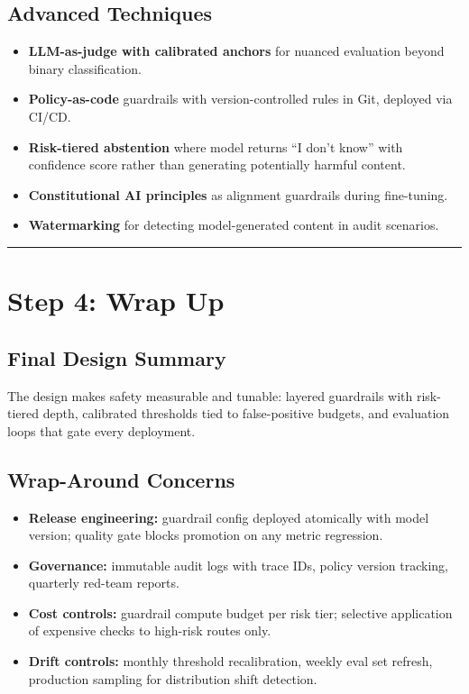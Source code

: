 \subsection*{Advanced Techniques}

\begin{itemize}
  \item \textbf{LLM-as-judge with calibrated anchors} for nuanced evaluation beyond binary classification.
  \item \textbf{Policy-as-code} guardrails with version-controlled rules in Git, deployed via CI/CD.
  \item \textbf{Risk-tiered abstention} where model returns ``I don't know'' with confidence score rather than generating potentially harmful content.
  \item \textbf{Constitutional AI principles} as alignment guardrails during fine-tuning.
  \item \textbf{Watermarking} for detecting model-generated content in audit scenarios.
\end{itemize}

\bigskip\hrule\bigskip

\section*{Step 4: Wrap Up}

\subsection*{Final Design Summary}

The design makes safety measurable and tunable: layered guardrails with risk-tiered depth, calibrated thresholds tied to false-positive budgets, and evaluation loops that gate every deployment.

\subsection*{Wrap-Around Concerns}

\begin{itemize}
  \item \textbf{Release engineering:} guardrail config deployed atomically with model version; quality gate blocks promotion on any metric regression.
  \item \textbf{Governance:} immutable audit logs with trace IDs, policy version tracking, quarterly red-team reports.
  \item \textbf{Cost controls:} guardrail compute budget per risk tier; selective application of expensive checks to high-risk routes only.
  \item \textbf{Drift controls:} monthly threshold recalibration, weekly eval set refresh, production sampling for distribution shift detection.
\end{itemize}


